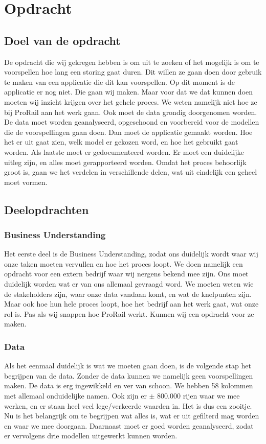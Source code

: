 \documentclass{article}
\begin{document}
\newpage
\section{Opdracht}

\subsection{Doel van de opdracht}
De opdracht die wij gekregen hebben is om uit te zoeken of het mogelijk is om te voorspellen hoe lang een storing gaat duren. Dit willen ze gaan doen door gebruik te maken van een applicatie die dit kan voorspellen. Op dit moment is de applicatie er nog niet. Die gaan wij maken. Maar voor dat we dat kunnen doen moeten wij inzicht krijgen over het gehele proces. We weten namelijk niet hoe ze bij ProRail aan het werk gaan. Ook moet de data grondig doorgenomen worden. De data moet worden geanalyseerd, opgeschoond en voorbereid voor de modellen die de voorspellingen gaan doen. Dan moet de applicatie gemaakt worden. Hoe het er uit gaat zien, welk model er gekozen word, en hoe het gebruikt gaat worden. Als laatste moet er gedocumenteerd worden. Er moet een duidelijke uitleg zijn, en alles moet gerapporteerd worden. Omdat het proces behoorlijk groot is, gaan we het verdelen in verschillende delen, wat uit eindelijk een geheel moet vormen.

\subsection{Deelopdrachten}

\subsubsection{Business Understanding}
Het eerste deel is de Business Understanding, zodat ons duidelijk wordt waar wij onze taken moeten vervullen en hoe het proces loopt. We doen namelijk een opdracht voor een extern bedrijf waar wij nergens bekend mee zijn. Ons moet duidelijk worden wat er van ons allemaal gevraagd word. We moeten weten wie de stakeholders zijn, waar onze data vandaan komt, en wat de knelpunten zijn. Maar ook hoe hun hele proces loopt, hoe het bedrijf aan het werk gaat, wat onze rol is. Pas als wij snappen hoe ProRail werkt. Kunnen wij een opdracht voor ze maken.

\subsubsection{Data}
Als het eenmaal duidelijk is wat we moeten gaan doen, is de volgende stap het begrijpen van de data. Zonder de data kunnen we namelijk geen voorspellingen maken. De data is erg ingewikkeld en ver van schoon. We hebben 58 kolommen met allemaal onduidelijke namen. Ook zijn er $\pm$ 800.000 rijen waar we mee werken, en er staan heel veel lege/verkeerde waarden in. Het is dus een zooitje. Nu is het belangrijk om te begrijpen wat alles is, wat er uit gefilterd mag worden en waar we mee doorgaan. Daarnaast moet er goed worden geanalyseerd, zodat er vervolgens drie modellen uitgewerkt kunnen worden.
\end{document}
